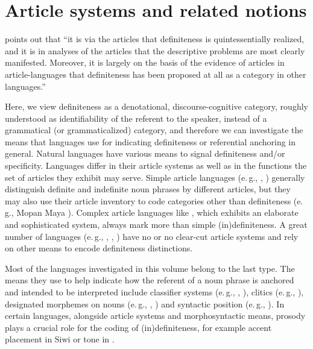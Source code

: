 \documentclass[output=paper]{langsci/langscibook}
\begin{document}
\section{Article systems and related notions}

\citet[][p.4]{chesterman:91} points out that ``it is via the articles that definiteness is quintessentially realized, and it is in analyses of the articles that the descriptive problems are most clearly manifested. Moreover, it is largely on the basis of the evidence of articles in article-languages that definiteness has been proposed at all as a category in other languages.''

Here, we view definiteness as a denotational, discourse-cognitive category, roughly understood as identifiability of the referent to the speaker, instead of a grammatical (or grammaticalized) category, and therefore we can investigate the means that languages use for indicating definiteness or referential anchoring in general. Natural languages have various means to signal definiteness and/or specificity. Languages differ in their article systems as well as in the functions the set of articles they exhibit may serve. Simple article languages (e.\,g., , ) generally distinguish definite and indefinite noun phrases by different articles, but they may also use their article inventory to code categories other than definiteness (e.\,g., Mopan Maya ). Complex article languages like , which exhibits an elaborate and sophisticated system, always mark more than simple (in)definiteness. A great number of languages (e.\,g., , , ) have no or no clear-cut article systems and rely on other means to encode definiteness distinctions. 

{
Most of the languages investigated in this volume belong to the last type. The means they use to help indicate how the referent of a noun phrase is anchored and intended to be interpreted include classifier systems (e.\,g., , ), clitics (e.\,g., ), designated morphemes on nouns (e.\,g., , ) and syntactic position (e.\,g., ). In certain languages, alongside article systems and morphosyntactic means, prosody plays a crucial role for the coding of (in)definiteness, for example  accent placement in Siwi  or tone in .
}
\end{document}
